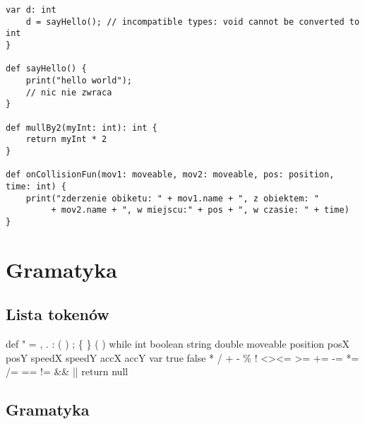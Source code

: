 \documentclass[12pt]{article}
\begin{document}
\begin{lstlisting}[columns=fullflexible,basicstyle=\tiny,tabsize=3,]
	var d: int
	d = sayHello(); // incompatible types: void cannot be converted to int
}

def sayHello() {
	print("hello world");
	// nic nie zwraca
}

def mullBy2(myInt: int): int {
	return myInt * 2
}

def onCollisionFun(mov1: moveable, mov2: moveable, pos: position, time: int) {
	print("zderzenie obiketu: " + mov1.name + ", z obiektem: "
		 + mov2.name + ", w miejscu:" + pos + ", w czasie: " + time)
}
\end{lstlisting}

\section{Gramatyka}
\subsection{Lista tokenów}

def " = , . : ( ) ; \{ \} ( ) while int boolean string double moveable position posX posY speedX speedY accX accY var true false * / + - \% ! \textless \textgreater \textless = \textgreater = += -= *= /= == != \&\& || return null

\subsection{Gramatyka}
\end{document}
